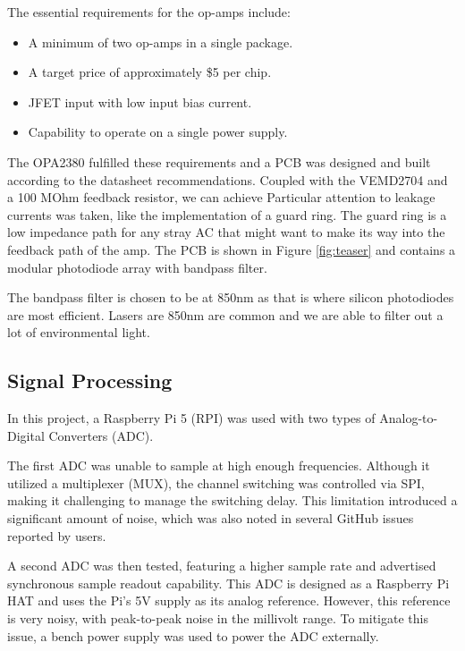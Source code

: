 
The essential requirements for the op-amps include:
\begin{itemize}
  \item A minimum of two op-amps in a single package.
  \item A target price of approximately \$5 per chip.
  \item JFET input with low input bias current.
  \item Capability to operate on a single power supply.
\end{itemize}

The OPA2380 fulfilled these requirements and a PCB was designed and built according to the datasheet recommendations. Coupled with the VEMD2704 and a 100 MOhm feedback resistor, we can achieve 
Particular attention to leakage currents was taken, like the implementation of a guard ring. The guard ring is a low impedance path for any stray AC that might want to make its way into the feedback path of the amp. The PCB is shown in Figure \ref{fig:teaser} and contains a modular photodiode array with bandpass filter.

The bandpass filter is chosen to be at 850nm as that is where silicon photodiodes are most efficient. Lasers are 850nm are common and we are able to filter out a lot of environmental light.


\subsection{Signal Processing}

In this project, a Raspberry Pi 5 (RPI) was used with two types of Analog-to-Digital Converters (ADC).

The first ADC was unable to sample at high enough frequencies. Although it utilized a multiplexer (MUX), the channel switching was controlled via SPI, making it challenging to manage the switching delay. This limitation introduced a significant amount of noise, which was also noted in several GitHub issues reported by users.

A second ADC was then tested, featuring a higher sample rate and advertised synchronous sample readout capability. This ADC is designed as a Raspberry Pi HAT and uses the Pi's 5V supply as its analog reference. However, this reference is very noisy, with peak-to-peak noise in the millivolt range. To mitigate this issue, a bench power supply was used to power the ADC externally.

